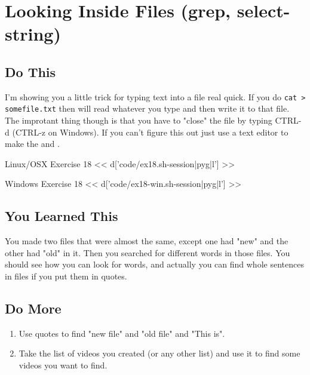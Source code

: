 \chapter{Looking Inside Files (grep, select-string)}

\section{Do This}

I'm showing you a little trick for typing text into a file real quick.  If you
do \verb|cat > somefile.txt| then  will read whatever you type and
then write it to that file.  The improtant thing though is that you have to
"close" the file by typing CTRL-d (CTRL-z on Windows).  If you can't figure this 
out just use a text editor to make the  and .

\begin{code}{Linux/OSX Exercise 18}
<< d['code/ex18.sh-session|pyg|l'] >>
\end{code}

\begin{code}{Windows Exercise 18}
<< d['code/ex18-win.sh-session|pyg|l'] >>
\end{code}

\section{You Learned This}

You made two files that were almost the same, except one had "new" and the other 
had "old" in it.  Then you searched for different words in those files.  You should
see how you can look for words, and actually you can find whole sentences in
files if you put them in quotes.

\section{Do More}

\begin{enumerate}
\item Use quotes to find "new file" and "old file" and "This is".
\item Take the list of videos you created (or any other list) and use it to find some videos you want to find.
\end{enumerate}

